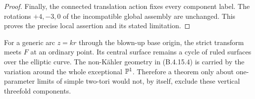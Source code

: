 \begin{proof}
Finally, the connected translation action fixes every
component label. The rotations $+4,-3,0$ of the
incompatible global assembly are unchanged. This proves
the precise local assertion and its stated limitation.
\end{proof}

\begin{remark}
For a generic arc $z=kr$ through the blown-up base
origin, the strict transform meets $F$ at an ordinary
point. Its central surface remains a cycle of ruled
surfaces over the elliptic curve. The non-K\"ahler
geometry in (B.4.15.4) is carried by the variation
around the whole exceptional $\mathbb P^1$. Therefore a
theorem only about one-parameter limits of simple
two-tori would not, by itself, exclude these vertical
threefold components.
\end{remark}
